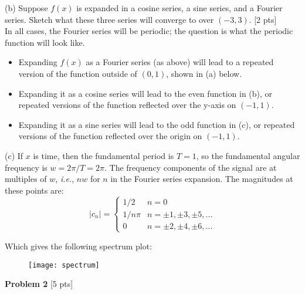 \documentclass[11pt]{article}
\newcommand{\ie}{{\em i.e.}, }
\begin{document}
(b) Suppose $f(x)$ is expanded in a cosine series, a sine series, and a Fourier series. Sketch what these three series will converge to over $(-3, 3)$. [2 pts] \\

In all cases, the Fourier series will be periodic; the question is what the periodic function will look like.
\begin{itemize}
\item Expanding $f(x)$ as a Fourier series (as above) will lead to a repeated version of the function outside of $(0,1)$, shown in (a) below.
\item Expanding it as a cosine series will lead to the even function in (b), or repeated versions of the function reflected over the y-axis on $(-1,1)$.
\item Expanding it as a sine series will lead to the odd function in (c), or repeated versions of the function reflected over the origin on $(-1,1)$.
\end{itemize}

\begin{figure}[h]
\hspace{-0.5in}
\end{figure}

(c) If $x$ is time, then the fundamental period is $T = 1$, so the fundamental angular frequency is $w = 2 \pi / T = 2 \pi$. The frequency components of the signal are at multiples of $w$, \ie $n w$ for $n$ in the Fourier series expansion. The magnitudes at these points are:
\begin{equation*}
|c_n| = \begin{cases} 1/2 & n = 0 \\  1 / n \pi & n = \pm 1, \pm 3, \pm 5, ... \\ 0 & n = \pm 2, \pm 4, \pm 6, ... \end{cases}
\end{equation*}

Which gives the following spectrum plot:

\begin{figure}[h]
\centering
\texttt{[image: spectrum]}
\end{figure}

\vspace{0.5in}

\textbf{Problem 2} [5 pts]
\end{document}
